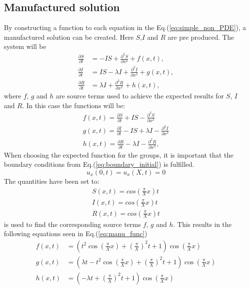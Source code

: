 \documentclass[%
twoside,                 %
final,                   %
chapterprefix=true,      %
open=right               %
10pt]{book}
\begin{document}
\subsection{Manufactured solution}
By constructing a function to each equation in the Eq.(\ref{eq:simple_non_PDE}), a manufactured solution can be created. Here $S$,$I$ and $R$ are pre produced. The system will be
\begin{equation} \label{eq:simple_non_PDE3}
	\begin{aligned}
	\frac{\partial S}{\partial t} &= -IS + \frac{\partial^2 S}{\partial x^2}+f(x,t),\\
	\frac{\partial I}{\partial t} &= IS- \lambda I + \frac{\partial^2 I}{\partial x^2}+g(x,t),\\
	\frac{\partial R}{\partial t} &= \lambda I + \frac{\partial^2 R}{\partial x^2}+h(x,t),
	\end{aligned}
\end{equation}
where $f$, $g$ and $h$ are source terms used to achieve the expected results for $S$, $I$ and $R$. In this case the functions will be:
\begin{equation}
	\begin{aligned}
	f(x,t) = \frac{\partial S}{\partial t} + IS - \frac{\partial^2 S}{\partial x^2}\\
	g(x,t) = \frac{\partial I}{\partial t} - IS + \lambda I - \frac{\partial^2 I}{\partial x^2}\\
	h(x,t) = \frac{\partial R}{\partial t} -\lambda I - \frac{\partial^2 R}{\partial x^2},
	\end{aligned}
\end{equation}
When choosing the expected function for the groups, it is important that the boundary conditions from Eq.(\ref{eq:boundary_initial}) is fulfilled.
\begin{equation}
    u_x(0,t) = u_x(X,t) = 0
\end{equation}
The quantities have been set to:
\begin{equation}
	\begin{aligned}
    S(x,t) = cos(\frac{\pi}{X}x)t\\
    I(x,t) = cos(\frac{\pi}{X}x)t\\
    R(x,t) = cos(\frac{\pi}{X}x)t
	\end{aligned}
\end{equation}
 is used to find the corresponding source terms $f$, $g$ and $h$. This results in the following equations seen in Eq.(\ref{eq:manu_func}) 
\begin{equation} \label{eq:manu_func}
	\begin{aligned}
	f(x,t) &= (t^2\cos(\frac{\pi}{X} x) + (\frac{\pi}{X})^2t + 1)\cos(\frac{\pi}{X} x)\\
	g(x,t) &= (\lambda t - t^2\cos(\frac{\pi}{X} x) + (\frac{\pi}{X})^2t + 1)\cos(\frac{\pi}{X} x)\\
	h(x,t) &= (-\lambda t + (\frac{\pi}{X})^2t + 1)\cos(\frac{\pi}{X} x)
	\end{aligned}
\end{equation}
\end{document}
